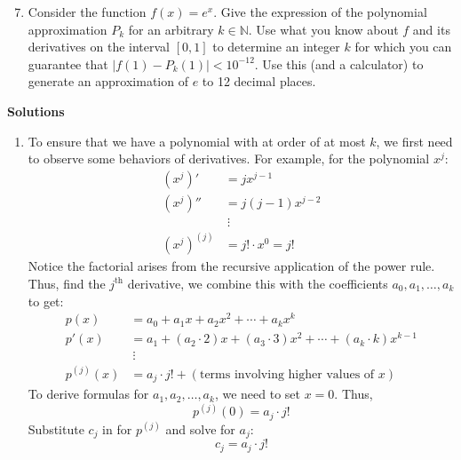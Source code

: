\documentclass[12pt]{article}
\newcommand{\N}{\ensuremath{\mathbb{N}}}
\begin{document}
\begin{enumerate}
    \setcounter{enumi}{6}
    \item Consider the function \(f(x) = e^{x}\). Give the expression of the polynomial approximation \(P_{k}\) for an arbitrary \(k \in \N\). Use what you know about \(f\) and its derivatives on the interval \([0,1]\) to determine an integer \(k\) for which you can guarantee that \(|f(1) - P_{k}(1)| < 10^{-12}\). Use this (and a calculator) to generate an approximation of \(e\) to 12 decimal places.
\end{enumerate}
\newpage

\begin{center}
    \textbf{Solutions}
\end{center}

\begin{enumerate}
    \item
          To ensure that we have a polynomial with at order of at most \(k\), we first need to observe some behaviors of derivatives. For example, for the polynomial \(x^{j}\):
          \begin{align*}
              (x^{j})'      & = jx^{j - 1}         \\
              (x^{j})''     & = j(j - 1)x^{j - 2}  \\
                            & ~\vdots              \\
              (x^{j})^{(j)} & = j!\cdot x^{0} = j!
          \end{align*}
          Notice the factorial arises from the recursive application of the power rule. Thus, find the \(j^{\text{th}}\) derivative, we combine this with the coefficients \(a_{0},a_{1},\ldots,a_{k}\) to get:
          \begin{align*}
              p(x)       & = a_0 + a_1 x + a_2 x^2 + \cdots + a_k x^k                                               \\
              p'(x)      & = a_{1} + (a_{2} \cdot 2) x + (a_{3} \cdot 3) x^{2} + \cdots + (a_{k} \cdot k) x^{k - 1} \\
                         & ~\vdots                                                                                  \\
              p^{(j)}(x) & = a_{j} \cdot j! + (\text{terms involving higher values of } x)
          \end{align*}
          To derive formulas for \(a_{1}, a_{2}, \dots, a_{k}\), we need to set \(x = 0\). Thus,
          \[
              p^{(j)}(0) = a_{j} \cdot j!
          \]
          Substitute \(c_{j}\) in for \(p^{(j)}\) and solve for \(a_{j}\):
          \[
              c_j = a_j \cdot j!
          \]


\end{enumerate}
\end{document}
